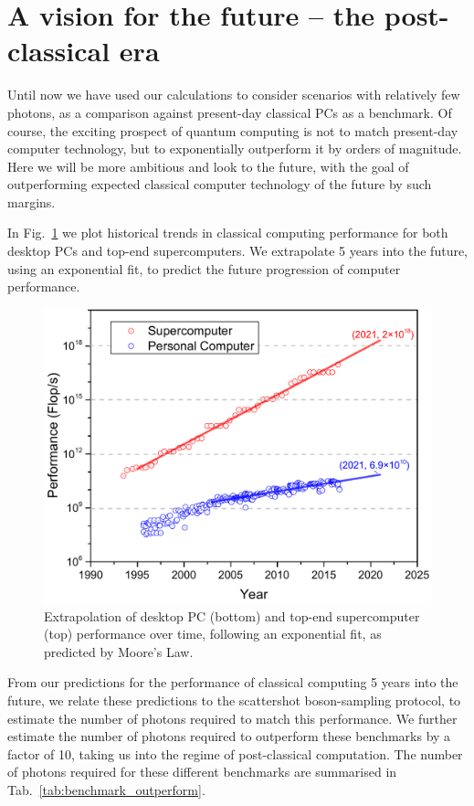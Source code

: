 \documentclass[aps,rmp,twocolumn,amsmath,amssymb,nofootinbib,superscriptaddress]{revtex4}
\begin{document}
\section{A vision for the future -- the post-classical era}

Until now we have used our calculations to consider scenarios with relatively few photons, as a comparison against present-day classical PCs as a benchmark. Of course, the exciting prospect of quantum computing is not to match present-day computer technology, but to exponentially outperform it by orders of magnitude. Here we will be more ambitious and look to the future, with the goal of outperforming expected classical computer technology of the future by such margins.

In Fig.~\ref{fig:moores_law} we plot historical trends in classical computing performance for both desktop PCs and top-end supercomputers. We extrapolate 5 years into the future, using an exponential fit, to predict the future progression of computer performance.

\begin{figure}[!htb]
\includegraphics[width=\columnwidth]{moores_law}
\caption{Extrapolation of desktop PC (bottom) and top-end supercomputer (top) performance over time, following an exponential fit, as predicted by Moore's Law.} \label{fig:moores_law}
\end{figure}

From our predictions for the performance of classical computing 5 years into the future, we relate these predictions to the scattershot boson-sampling protocol, to estimate the number of photons required to match this performance. We further estimate the number of photons required to outperform these benchmarks by a factor of 10, taking us into the regime of post-classical computation. The number of photons required for these different benchmarks are summarised in Tab.~\ref{tab:benchmark_outperform}.
\end{document}
